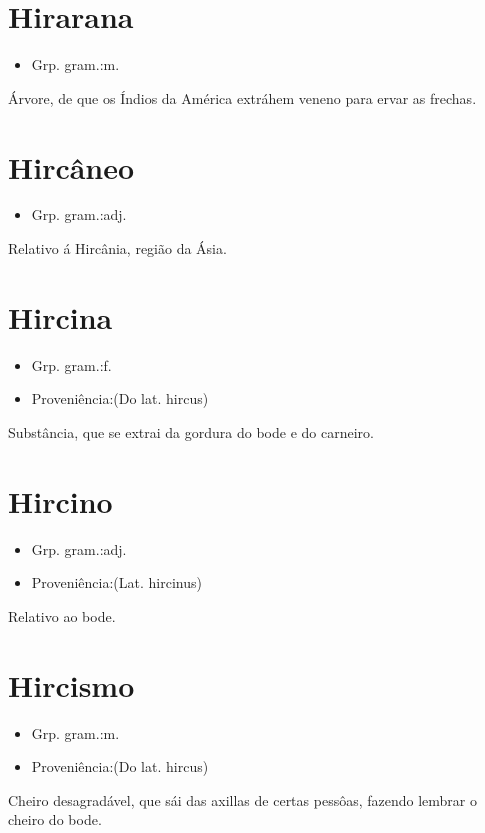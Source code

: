 \documentclass{article}
\begin{document}
\section{Hirarana}
\begin{itemize}
\item {Grp. gram.:m.}
\end{itemize}
Árvore, de que os Índios da América extráhem veneno para ervar as frechas.
\section{Hircâneo}
\begin{itemize}
\item {Grp. gram.:adj.}
\end{itemize}
Relativo á Hircânia, região da Ásia.
\section{Hircina}
\begin{itemize}
\item {Grp. gram.:f.}
\end{itemize}
\begin{itemize}
\item {Proveniência:(Do lat. \textunderscore hircus\textunderscore )}
\end{itemize}
Substância, que se extrai da gordura do bode e do carneiro.
\section{Hircino}
\begin{itemize}
\item {Grp. gram.:adj.}
\end{itemize}
\begin{itemize}
\item {Proveniência:(Lat. \textunderscore hircinus\textunderscore )}
\end{itemize}
Relativo ao bode.
\section{Hircismo}
\begin{itemize}
\item {Grp. gram.:m.}
\end{itemize}
\begin{itemize}
\item {Proveniência:(Do lat. \textunderscore hircus\textunderscore )}
\end{itemize}
Cheiro desagradável, que sái das axillas de certas pessôas, fazendo lembrar o cheiro do bode.
\end{document}
